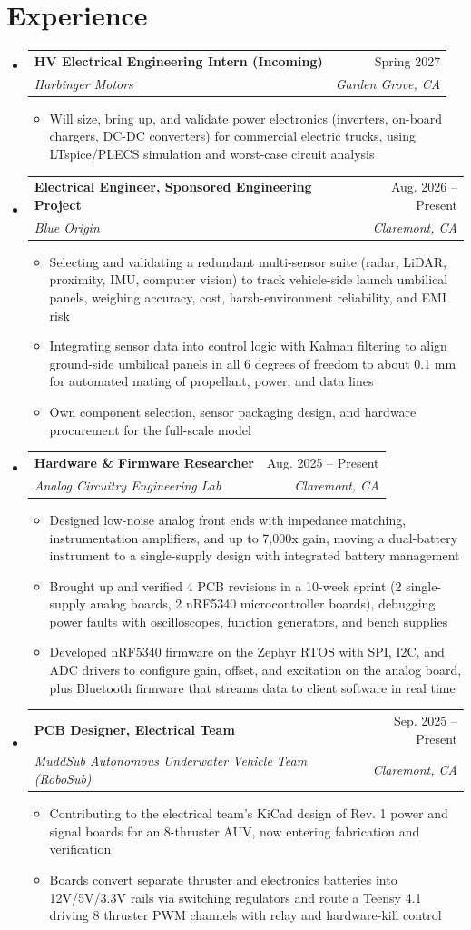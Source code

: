 \documentclass[letterpaper,11pt]{article}
\makeatletter
\newcommand{\resumeItem}[1]{
  \item\small{
    {#1 \vspace{-2pt}}
  }
}
\newcommand{\resumeSubheading}[4]{
  \vspace{-2pt}\item
    \begin{tabular*}{0.97\textwidth}[t]{l@{\extracolsep{\fill}}r}
      \textbf{#1} & #2 \\
      \textit{\small#3} & \textit{\small #4} \\
    \end{tabular*}\vspace{-7pt}
}
\newcommand{\resumeSubHeadingListStart}{\begin{itemize}[leftmargin=0.15in, label={}]}
\newcommand{\resumeSubHeadingListEnd}{\end{itemize}}
\newcommand{\resumeItemListStart}{\begin{itemize}}
\newcommand{\resumeItemListEnd}{\end{itemize}\vspace{-5pt}}
\makeatother
\begin{document}
\section{Experience}
\resumeSubHeadingListStart
\resumeSubheading
{HV Electrical Engineering Intern (Incoming)}{Spring 2027}
{Harbinger Motors}{Garden Grove, CA}
\resumeItemListStart
\resumeItem{Will size, bring up, and validate power electronics (inverters, on-board chargers, DC-DC converters) for commercial electric trucks, using LTspice/PLECS simulation and worst-case circuit analysis}
\resumeItemListEnd
\resumeSubheading
{Electrical Engineer, Sponsored Engineering Project}{Aug. 2026 -- Present}
{Blue Origin}{Claremont, CA}
\resumeItemListStart
\resumeItem{Selecting and validating a redundant multi-sensor suite (radar, LiDAR, proximity, IMU, computer vision) to track vehicle-side launch umbilical panels, weighing accuracy, cost, harsh-environment reliability, and EMI risk}
\resumeItem{Integrating sensor data into control logic with Kalman filtering to align ground-side umbilical panels in all 6 degrees of freedom to about 0.1 mm for automated mating of propellant, power, and data lines}
\resumeItem{Own component selection, sensor packaging design, and hardware procurement for the full-scale model}
\resumeItemListEnd
\resumeSubheading
{Hardware \& Firmware Researcher}{Aug. 2025 -- Present}
{Analog Circuitry Engineering Lab}{Claremont, CA}
\resumeItemListStart
\resumeItem{Designed low-noise analog front ends with impedance matching, instrumentation amplifiers, and up to 7,000x gain, moving a dual-battery instrument to a single-supply design with integrated battery management}
\resumeItem{Brought up and verified 4 PCB revisions in a 10-week sprint (2 single-supply analog boards, 2 nRF5340 microcontroller boards), debugging power faults with oscilloscopes, function generators, and bench supplies}
\resumeItem{Developed nRF5340 firmware on the Zephyr RTOS with SPI, I2C, and ADC drivers to configure gain, offset, and excitation on the analog board, plus Bluetooth firmware that streams data to client software in real time}
\resumeItemListEnd
\resumeSubheading
{PCB Designer, Electrical Team}{Sep. 2025 -- Present}
{MuddSub Autonomous Underwater Vehicle Team (RoboSub)}{Claremont, CA}
\resumeItemListStart
\resumeItem{Contributing to the electrical team's KiCad design of Rev. 1 power and signal boards for an 8-thruster AUV, now entering fabrication and verification}
\resumeItem{Boards convert separate thruster and electronics batteries into 12V/5V/3.3V rails via switching regulators and route a Teensy 4.1 driving 8 thruster PWM channels with relay and hardware-kill control}
\resumeItemListEnd
\resumeSubHeadingListEnd
\end{document}
